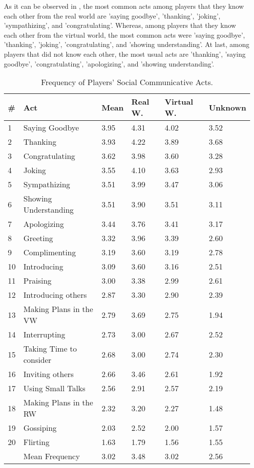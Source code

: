 \documentclass[english]{textolivre}
\begin{document}
As it can be observed in ,  the most common acts among players that they know each other from the real world are 'saying goodbye', 'thanking', 'joking', 'sympathizing’, and 'congratulating’. Whereas, among players that they know each other from the virtual world, the most common acts were 'saying goodbye', 'thanking', 'joking', 'congratulating', and 'showing understanding'. At last, among players that did not know each other, the most usual acts are 'thanking', 'saying goodbye', 'congratulating', 'apologizing', and 'showing understanding'.

\begin{table}[htpb]
\caption{Frequency of Players’ Social Communicative Acts.}
\label{figure1}
\centering
\begin{tabular}{p{}p{}p{}p{}p{}p{}}
\toprule 
\# & Act & Mean & Real W. & Virtual W. & Unknown
\\ 
\midrule
1 & Saying Goodbye & 3.95 & 4.31 & 4.02 & 3.52
\\
2 & Thanking & 3.93 & 4.22 & 3.89 & 3.68
\\
3 & Congratulating & 3.62 & 3.98 & 3.60 & 3.28
\\
4 & Joking & 3.55 & 4.10 & 3.63 & 2.93
\\
5 & Sympathizing & 3.51 & 3.99 & 3.47 & 3.06
\\
6 & Showing Understanding & 3.51 & 3.90 & 3.51 & 3.11
\\
7 & Apologizing & 3.44 & 3.76 & 3.41 & 3.17
\\
8 & Greeting & 3.32 & 3.96 & 3.39 & 2.60
\\
9 & Complimenting & 3.19 & 3.60 & 3.19 & 2.78
\\
10 & Introducing & 3.09 & 3.60 & 3.16 & 2.51
\\
11 & Praising & 3.00 & 3.38 & 2.99 & 2.61
\\
12 & Introducing others & 2.87 & 3.30 & 2.90 & 2.39
\\
13 & Making Plans in the VW & 2.79 & 3.69 & 2.75 & 1.94
\\
14 & Interrupting & 2.73 & 3.00 & 2.67 & 2.52
\\
15 & Taking Time to consider & 2.68 & 3.00 & 2.74 & 2.30
\\
16 & Inviting others & 2.66 & 3.46 & 2.61 & 1.92
\\
17 & Using Small Talks & 2.56 & 2.91 & 2.57 & 2.19
\\
18 & Making Plans in the RW & 2.32 & 3.20 & 2.27 & 1.48
\\
19 & Gossiping & 2.03 & 2.52 & 2.00 & 1.57
\\
20 & Flirting & 1.63 & 1.79 & 1.56 & 1.55
\\ 
\midrule
& Mean Frequency & 3.02 & 3.48 & 3.02 & 2.56
\\
\bottomrule
\end{tabular}
\end{table}
\end{document}

